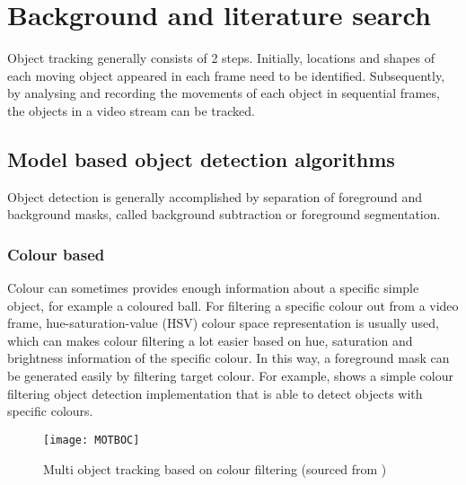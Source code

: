 \chapter{Background and literature search}

\iffalse
There are lots of different algorithms existing in the field of object detection and tracking. Some of those algorithms were investigated in this project in order to identify a set of suitable algorithms that were both accurate and efficient enough to analysis video stream from camera in real time.
\fi

Object tracking generally consists of 2 steps. Initially, locations and shapes of each moving object appeared in each frame need to be identified. Subsequently, by analysing and recording the movements of each object in sequential frames, the objects in a video stream can be tracked.

\section{Model based object detection algorithms}

\iffalse
Being able to detect objects in a video frame is the first, also the most important and challenging step to do object tracking. This is generally accomplished by separation of foreground objects and background image.
\fi

Object detection is generally accomplished by separation of foreground and background masks, called background subtraction or foreground segmentation.

\subsection{Colour based}
\label{bgs:colour}

Colour can sometimes provides enough information about a specific simple object, for example a coloured ball. For filtering a specific colour out from a video frame, hue-saturation-value (HSV) colour space \cite[p.~301]{colourspace} representation is usually used, which can makes colour filtering a lot easier based on hue, saturation and brightness information of the specific colour. In this way, a foreground mask can be generated easily by filtering target colour. For example,  shows a simple colour filtering object detection implementation \cite{MOTBOC.git} that is able to detect objects with specific colours.

\begin{figure}[H]
  \centering
  \texttt{[image: MOTBOC]}
  \caption{Multi object tracking based on colour filtering (sourced from \cite{MOTBOC.git})}
  \label{Figure:MOTBOC}
\end{figure}

